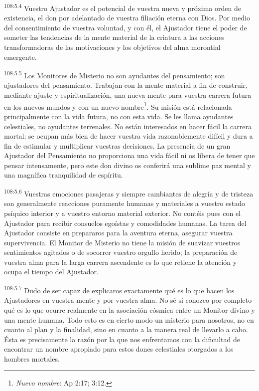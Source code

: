 \par
\textsuperscript{108:5.4} Vuestro Ajustador es el potencial de vuestra nueva y próxima orden de existencia, el don por adelantado de vuestra filiación eterna con Dios. Por medio del consentimiento de vuestra voluntad, y con él, el Ajustador tiene el poder de someter las tendencias de la mente material de la criatura a las acciones transformadoras de las motivaciones y los objetivos del alma morontial emergente.

\par
\textsuperscript{108:5.5} Los Monitores de Misterio no son ayudantes del pensamiento; son ajustadores del pensamiento. Trabajan con la mente material a fin de construir, mediante ajuste y espiritualización, una nueva mente para vuestra carrera futura en los nuevos mundos y con un nuevo nombre\footnote{\textit{Nuevo nombre}: Ap 2:17; 3:12.}. Su misión está relacionada principalmente con la vida futura, no con esta vida. Se les llama ayudantes celestiales, no ayudantes terrenales. No están interesados en hacer fácil la carrera mortal; se ocupan más bien de hacer vuestra vida razonablemente difícil y dura a fin de estimular y multiplicar vuestras decisiones. La presencia de un gran Ajustador del Pensamiento no proporciona una vida fácil ni os libera de tener que pensar intensamente, pero este don divino os conferirá una sublime paz mental y una magnífica tranquilidad de espíritu.

\par
\textsuperscript{108:5.6} Vuestras emociones pasajeras y siempre cambiantes de alegría y de tristeza son generalmente reacciones puramente humanas y materiales a vuestro estado psíquico interior y a vuestro entorno material exterior. No contéis pues con el Ajustador para recibir consuelos egoístas y comodidades humanas. La tarea del Ajustador consiste en prepararos para la aventura eterna, asegurar vuestra supervivencia. El Monitor de Misterio no tiene la misión de suavizar vuestros sentimientos agitados o de socorrer vuestro orgullo herido; la preparación de vuestra alma para la larga carrera ascendente es lo que retiene la atención y ocupa el tiempo del Ajustador.

\par
\textsuperscript{108:5.7} Dudo de ser capaz de explicaros exactamente qué es lo que hacen los Ajustadores en vuestra mente y por vuestra alma. No sé si conozco por completo qué es lo que ocurre realmente en la asociación cósmica entre un Monitor divino y una mente humana. Todo esto es en cierto modo un misterio para nosotros, no en cuanto al plan y la finalidad, sino en cuanto a la manera real de llevarlo a cabo. Ésta es precisamente la razón por la que nos enfrentamos con la dificultad de encontrar un nombre apropiado para estos dones celestiales otorgados a los hombres mortales.

